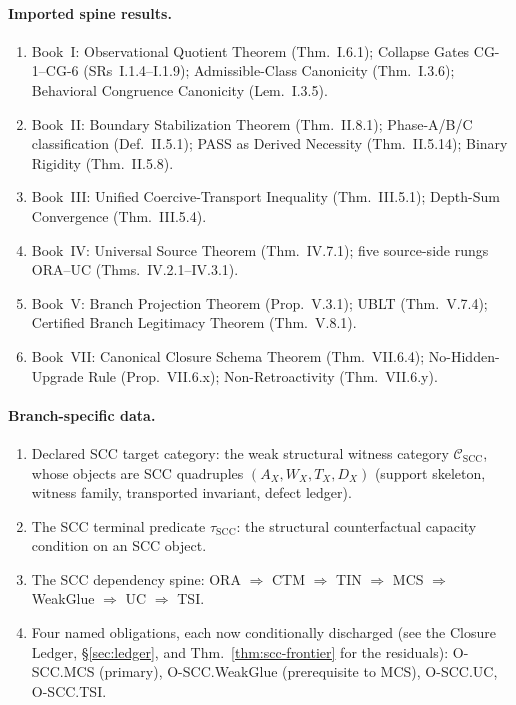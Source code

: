 \documentclass[12pt,oneside]{amsbook}
\theoremstyle{plain}
\theoremstyle{definition}
\theoremstyle{remark}
\begin{document}
\paragraph{Imported spine results.}
\begin{enumerate}[label=\textup{(\arabic*)}]
 \item Book~I: Observational Quotient Theorem (Thm.~I.6.1);
 Collapse Gates CG-1--CG-6 (SRs~I.1.4--I.1.9);
 Admissible-Class Canonicity (Thm.~I.3.6);
 Behavioral Congruence Canonicity (Lem.~I.3.5).
 \item Book~II: Boundary Stabilization Theorem (Thm.~II.8.1);
 Phase-A/B/C classification (Def.~II.5.1);
 PASS as Derived Necessity (Thm.~II.5.14);
 Binary Rigidity (Thm.~II.5.8).
 \item Book~III: Unified Coercive-Transport Inequality
 (Thm.~III.5.1); Depth-Sum Convergence (Thm.~III.5.4).
 \item Book~IV: Universal Source Theorem (Thm.~IV.7.1);
 five source-side rungs ORA--UC (Thms.~IV.2.1--IV.3.1).
 \item Book~V: Branch Projection Theorem (Prop.~V.3.1);
 UBLT (Thm.~V.7.4); Certified Branch Legitimacy Theorem
 (Thm.~V.8.1).
 \item Book~VII: Canonical Closure Schema Theorem
 (Thm.~VII.6.4); No-Hidden-Upgrade Rule
 (Prop.~VII.6.x); Non-Retroactivity (Thm.~VII.6.y).
\end{enumerate}

\paragraph{Branch-specific data.}
\begin{enumerate}[label=\textup{(\arabic*)}]
 \item Declared SCC target category: the weak structural
 witness category $\mathcal{C}_{\mathrm{SCC}}$, whose
 objects are SCC quadruples $(A_X, W_X, T_X, D_X)$
 (support skeleton, witness family, transported invariant,
 defect ledger).
 \item The SCC terminal predicate $\tau_{\mathrm{SCC}}$: the
 structural counterfactual capacity condition on an SCC
 object.
 \item The SCC dependency spine: ORA $\Rightarrow$ CTM
 $\Rightarrow$ TIN $\Rightarrow$ MCS $\Rightarrow$
 WeakGlue $\Rightarrow$ UC $\Rightarrow$ TSI.
 \item Four named obligations, each now conditionally discharged
 (see the Closure Ledger, \S\ref{sec:ledger}, and
 Thm.~\ref{thm:scc-frontier} for the residuals): O-SCC.MCS
 (primary), O-SCC.WeakGlue (prerequisite to MCS), O-SCC.UC,
 O-SCC.TSI.
\end{enumerate}
\end{document}
